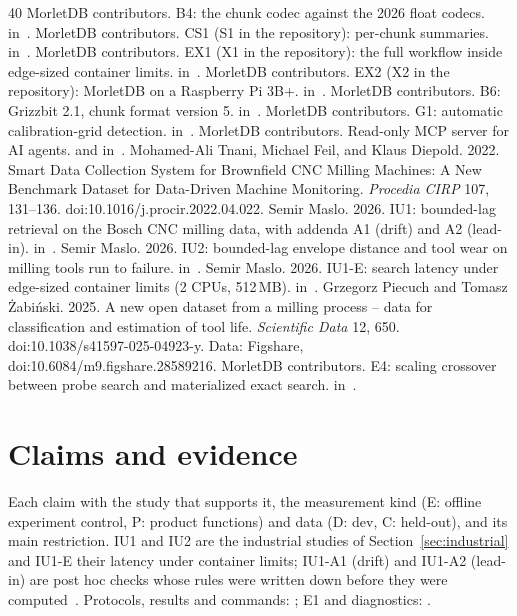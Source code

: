 \documentclass[sigconf]{acmart}
\newcommand{\M}{MorletDB}
\begin{document}
\begin{thebibliography}{40}
 \M{} contributors. B4: the chunk codec against the 2026 float codecs.  in~\cite{repo}.
 \M{} contributors. CS1 (S1 in the repository): per-chunk summaries.  in~\cite{repo}.
 \M{} contributors. EX1 (X1 in the repository): the full workflow inside edge-sized container limits.  in~\cite{repo}.
 \M{} contributors. EX2 (X2 in the repository): \M{} on a Raspberry Pi 3B+.  in~\cite{repo}.
 \M{} contributors. B6: Grizzbit 2.1, chunk format version 5.  in~\cite{repo}.
 \M{} contributors. G1: automatic calibration-grid detection.  in~\cite{repo}.
 \M{} contributors. Read-only MCP server for AI agents.  and  in~\cite{repo}.
 Mohamed-Ali Tnani, Michael Feil, and Klaus Diepold. 2022. Smart Data Collection System for Brownfield CNC Milling Machines: A New Benchmark Dataset for Data-Driven Machine Monitoring. \emph{Procedia CIRP} 107, 131--136. doi:10.1016/j.procir.2022.04.022.
 Semir Maslo. 2026. IU1: bounded-lag retrieval on the Bosch CNC milling data, with addenda A1 (drift) and A2 (lead-in).  in~\cite{repo}.
 Semir Maslo. 2026. IU2: bounded-lag envelope distance and tool wear on milling tools run to failure.  in~\cite{repo}.
 Semir Maslo. 2026. IU1-E: search latency under edge-sized container limits (2 CPUs, 512\,MB).  in~\cite{repo}.
 Grzegorz Piecuch and Tomasz Żabiński. 2025. A new open dataset from a milling process -- data for classification and estimation of tool life. \emph{Scientific Data} 12, 650. doi:10.1038/s41597-025-04923-y. Data: Figshare, doi:10.6084/m9.figshare.28589216.
 \M{} contributors. E4: scaling crossover between probe search and materialized exact search.  in~\cite{repo}.
\end{thebibliography}

\ifdefined\SigmodSubmission\else
\onecolumn
\appendix
\section{Claims and evidence}\label{sec:ledger}
Each claim with the study that supports it, the measurement kind (E: offline experiment control, P: product functions) and data (D: dev, C: held-out), and its main restriction. IU1 and IU2 are the industrial studies of Section~\ref{sec:industrial} and IU1-E their latency under container limits; IU1-A1 (drift) and IU1-A2 (lead-in) are post hoc checks whose rules were written down before they were computed~\cite{iu1,iu2,iu1e}. Protocols, results and commands: \cite{repo}; E1 and diagnostics: \cite{e1}.
\end{document}
